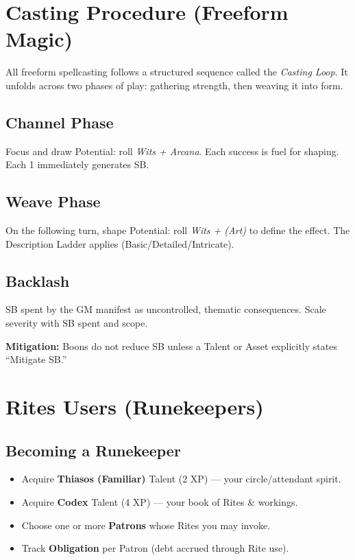 \section{Casting Procedure (Freeform Magic)}
\label{sec:casting-procedure}

All freeform spellcasting follows a structured sequence called the \emph{Casting Loop}. It unfolds across two phases of play: gathering strength, then weaving it into form.

\subsection{Channel Phase}
\label{subsec:channel-phase}
Focus and draw Potential: roll \emph{Wits + Arcana}. Each success is fuel for shaping. Each 1 immediately generates SB. 

\subsection{Weave Phase}
\label{subsec:weave-phase}
On the following turn, shape Potential: roll \emph{Wits + (Art)} to define the effect. The Description Ladder applies (Basic/Detailed/Intricate). 

\subsection{Backlash}
\label{subsec:backlash}
SB spent by the GM manifest as uncontrolled, thematic consequences. Scale severity with SB spent and scope.

\textbf{Mitigation:} Boons do not reduce SB unless a Talent or Asset explicitly states ``Mitigate SB.'' 

\section{Rites Users (Runekeepers)}
\label{sec:rites-users}

\subsection{Becoming a Runekeeper}
\label{subsec:becoming-runekeeper}
\begin{itemize}
  \item Acquire \textbf{Thiasos (Familiar)} Talent (2 XP) — your circle/attendant spirit. 
  \item Acquire \textbf{Codex} Talent (4 XP) — your book of Rites \& workings. 
  \item Choose one or more \textbf{Patrons} whose Rites you may invoke.
  \item Track \textbf{Obligation} per Patron (debt accrued through Rite use). 
\end{itemize}

